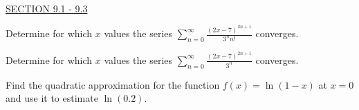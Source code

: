 \documentclass{exam}
\begin{document}
\begin{questions}
\ \\
\underline{SECTION 9.1 - 9.3}

\question Determine for which $x$ values the series $\displaystyle\sum_{n=0}^\infty \frac{(2x-7)^{2n+1}}{3^n n!}$ converges. 

\question Determine for which $x$ values the series $\displaystyle\sum_{n=0}^\infty \frac{(2x-7)^{2n+1}}{3^n }$ converges.  

\question Find the quadratic approximation for the function $f(x) = \ln(1-x)$ at $x=0$ and use it to estimate $\ln(0.2)$.  









\end{questions}
\end{document}
